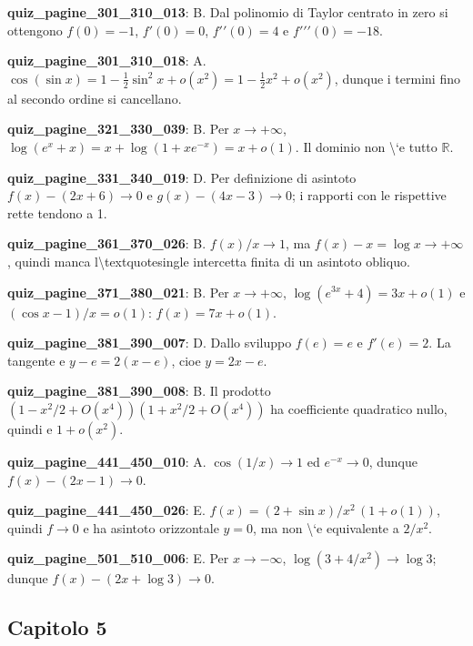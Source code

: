 \documentclass[11pt,a4paper]{article}
\newcounter{quiz}
\begin{document}
\noindent\textbf{quiz\_pagine\_301\_310\_013}: B. Dal polinomio di Taylor centrato in zero si ottengono $f(0)=-1$, $f\prime(0)=0$, $f\prime\prime(0)=4$ e $f\prime\prime\prime(0)=-18$.\par\medskip
\noindent\textbf{quiz\_pagine\_301\_310\_018}: A. $\cos(\sin x)=1-\frac12\sin^2x+o(x^2)=1-\frac12x^2+o(x^2)$, dunque i termini fino al secondo ordine si cancellano.\par\medskip
\noindent\textbf{quiz\_pagine\_321\_330\_039}: B. Per $x\to+\infty$, $\log(e^x+x)=x+\log(1+xe^{-x})=x+o(1)$. Il dominio non \textbackslash{}`e tutto $\mathbb R$.\par\medskip
\noindent\textbf{quiz\_pagine\_331\_340\_019}: D. Per definizione di asintoto $f(x)-(2x+6)\to0$ e $g(x)-(4x-3)\to0$; i rapporti con le rispettive rette tendono a 1.\par\medskip
\noindent\textbf{quiz\_pagine\_361\_370\_026}: B. $f(x)/x\to1$, ma $f(x)-x=\log x\to+\infty$, quindi manca l\textbackslash{}textquotesingle intercetta finita di un asintoto obliquo.\par\medskip
\noindent\textbf{quiz\_pagine\_371\_380\_021}: B. Per $x\to+\infty$, $\log(e^{3x}+4)=3x+o(1)$ e $(\cos x-1)/x=o(1)$: $f(x)=7x+o(1)$.\par\medskip
\noindent\textbf{quiz\_pagine\_381\_390\_007}: D. Dallo sviluppo $f(e)=e$ e $f\prime(e)=2$. La tangente e $y-e=2(x-e)$, cioe $y=2x-e$.\par\medskip
\noindent\textbf{quiz\_pagine\_381\_390\_008}: B. Il prodotto $(1-x^2/2+O(x^4))(1+x^2/2+O(x^4))$ ha coefficiente quadratico nullo, quindi e $1+o(x^2)$.\par\medskip
\noindent\textbf{quiz\_pagine\_441\_450\_010}: A. $\cos(1/x)\to1$ ed $e^{-x}\to0$, dunque $f(x)-(2x-1)\to0$.\par\medskip
\noindent\textbf{quiz\_pagine\_441\_450\_026}: E. $f(x)=(2+\sin x)/x^2\,(1+o(1))$, quindi $f\to0$ e ha asintoto orizzontale $y=0$, ma non \textbackslash{}`e equivalente a $2/x^2$.\par\medskip
\noindent\textbf{quiz\_pagine\_501\_510\_006}: E. Per $x\to-\infty$, $\log(3+4/x^2)\to\log3$; dunque $f(x)-(2x+\log3)\to0$.\par\medskip
\subsection*{Capitolo 5}
\end{document}
